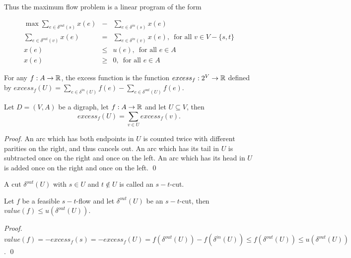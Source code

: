 Thus the maximum  flow problem is a linear program of the form 

\begin{eqnarray}
  \max \sum_{e \in \delta^{out}(s)} x(e) & - &   \sum_{e \in \delta^{in}(s)} x(e) \\
   \sum_{e \in \delta^{out}(v)} x(e) & = &  \sum_{e \in \delta^{in}(v)} x(e), \, \mbox{ for all
   } v \in V-\{s,t\} \\
   x(e) & \leq & u (e) , \, \mbox{ for all
   } e \in A \\
   x(e) & \geq & 0 , \, \mbox{ for all
   } e \in A
\end{eqnarray}


\begin{definition}
  For any $f:A \to \mathbb{R}$, the excess function is the function 
  $excess_f:  2^V \to \mathbb{R}$  defined by $excess_f(U) = \sum_{e \in \delta^{in}(U)}
  f(e) - \sum_{e \in \delta^{out}(U)} f(e)$. 
\end{definition}


\begin{theorem}
\label{f:thr:6}
Let $D = (V,A)$ be a digraph, let $f:A\to\mathbb{R}$ and let $U\subseteq V$, then
\begin{equation}
  \label{f:eq:28}
  excess_f(U) = \sum_{v \in U} excess_f(v).
\end{equation}  
\end{theorem}


\begin{proof}
  An arc which has both endpoints in $U$ is counted twice with
  different parities on the right, and thus cancels out. An arc which
  has its tail in $U$ is subtracted once on the right and once on the
  left.  An arc which has its head in $U$ is added once on the right
  and once on the left. \qed
\end{proof}

A cut $\delta^{out}(U)$ with $s \in U$  and $t \notin U$ is called an $s-t$-cut.  

\begin{theorem}
  \label{f:thr:7}
  Let $f$ be a feasible $s-t$-flow and let $\delta^{out}(U)$ be an
  $s-t$-cut, then $value(f) \leq u(\delta^{out}(U))$. 
\end{theorem}

\begin{proof}
  $value(f) = -excess_f(s) = -excess_f(U) = f(\delta^{out}(U)) -
  f(\delta^{in}(U)) \leq f(\delta^{out}(U)) \leq u(\delta^{out}(U))$. \qed
\end{proof}


